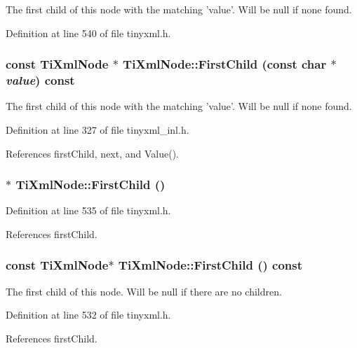 The first child of this node with the matching 'value'. Will be null if none found. 

Definition at line 540 of file tinyxml.h.\hypertarget{class_ti_xml_node_ab5f722624113c8203227de4f56576d31}{
\subsubsection[{FirstChild}]{\setlength{\rightskip}{0pt plus 5cm}const {\bf TiXmlNode} $\ast$ TiXmlNode::FirstChild (const char $\ast$ {\em value}) const}}
\label{class_ti_xml_node_ab5f722624113c8203227de4f56576d31}
The first child of this node with the matching 'value'. Will be null if none found. 

Definition at line 327 of file tinyxml\_\-inl.h.

References firstChild, next, and Value().\hypertarget{class_ti_xml_node_a5e97d69b7c0ebd27fb7286be56559b77}{
\subsubsection[{FirstChild}]{$\ast$ TiXmlNode::FirstChild ()}}
\label{class_ti_xml_node_a5e97d69b7c0ebd27fb7286be56559b77}


Definition at line 535 of file tinyxml.h.

References firstChild.\hypertarget{class_ti_xml_node_a44c8eee26bbe2d1b2762038df9dde2f0}{
\subsubsection[{FirstChild}]{\setlength{\rightskip}{0pt plus 5cm}const {\bf TiXmlNode}$\ast$ TiXmlNode::FirstChild () const}}
\label{class_ti_xml_node_a44c8eee26bbe2d1b2762038df9dde2f0}


The first child of this node. Will be null if there are no children. 

Definition at line 532 of file tinyxml.h.

References firstChild.

